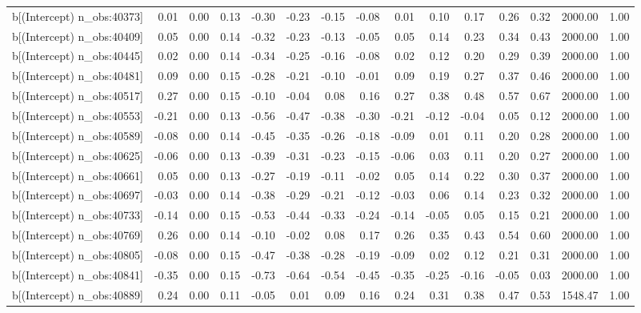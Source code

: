 \begin{table}[ht]
\begin{tabular}{rrrrrrrrrrrrrrr}
  b[(Intercept) n\_obs:40373] & 0.01 & 0.00 & 0.13 & -0.30 & -0.23 & -0.15 & -0.08 & 0.01 & 0.10 & 0.17 & 0.26 & 0.32 & 2000.00 & 1.00 \\ 
  b[(Intercept) n\_obs:40409] & 0.05 & 0.00 & 0.14 & -0.32 & -0.23 & -0.13 & -0.05 & 0.05 & 0.14 & 0.23 & 0.34 & 0.43 & 2000.00 & 1.00 \\ 
  b[(Intercept) n\_obs:40445] & 0.02 & 0.00 & 0.14 & -0.34 & -0.25 & -0.16 & -0.08 & 0.02 & 0.12 & 0.20 & 0.29 & 0.39 & 2000.00 & 1.00 \\ 
  b[(Intercept) n\_obs:40481] & 0.09 & 0.00 & 0.15 & -0.28 & -0.21 & -0.10 & -0.01 & 0.09 & 0.19 & 0.27 & 0.37 & 0.46 & 2000.00 & 1.00 \\ 
  b[(Intercept) n\_obs:40517] & 0.27 & 0.00 & 0.15 & -0.10 & -0.04 & 0.08 & 0.16 & 0.27 & 0.38 & 0.48 & 0.57 & 0.67 & 2000.00 & 1.00 \\ 
  b[(Intercept) n\_obs:40553] & -0.21 & 0.00 & 0.13 & -0.56 & -0.47 & -0.38 & -0.30 & -0.21 & -0.12 & -0.04 & 0.05 & 0.12 & 2000.00 & 1.00 \\ 
  b[(Intercept) n\_obs:40589] & -0.08 & 0.00 & 0.14 & -0.45 & -0.35 & -0.26 & -0.18 & -0.09 & 0.01 & 0.11 & 0.20 & 0.28 & 2000.00 & 1.00 \\ 
  b[(Intercept) n\_obs:40625] & -0.06 & 0.00 & 0.13 & -0.39 & -0.31 & -0.23 & -0.15 & -0.06 & 0.03 & 0.11 & 0.20 & 0.27 & 2000.00 & 1.00 \\ 
  b[(Intercept) n\_obs:40661] & 0.05 & 0.00 & 0.13 & -0.27 & -0.19 & -0.11 & -0.02 & 0.05 & 0.14 & 0.22 & 0.30 & 0.37 & 2000.00 & 1.00 \\ 
  b[(Intercept) n\_obs:40697] & -0.03 & 0.00 & 0.14 & -0.38 & -0.29 & -0.21 & -0.12 & -0.03 & 0.06 & 0.14 & 0.23 & 0.32 & 2000.00 & 1.00 \\ 
  b[(Intercept) n\_obs:40733] & -0.14 & 0.00 & 0.15 & -0.53 & -0.44 & -0.33 & -0.24 & -0.14 & -0.05 & 0.05 & 0.15 & 0.21 & 2000.00 & 1.00 \\ 
  b[(Intercept) n\_obs:40769] & 0.26 & 0.00 & 0.14 & -0.10 & -0.02 & 0.08 & 0.17 & 0.26 & 0.35 & 0.43 & 0.54 & 0.60 & 2000.00 & 1.00 \\ 
  b[(Intercept) n\_obs:40805] & -0.08 & 0.00 & 0.15 & -0.47 & -0.38 & -0.28 & -0.19 & -0.09 & 0.02 & 0.12 & 0.21 & 0.31 & 2000.00 & 1.00 \\ 
  b[(Intercept) n\_obs:40841] & -0.35 & 0.00 & 0.15 & -0.73 & -0.64 & -0.54 & -0.45 & -0.35 & -0.25 & -0.16 & -0.05 & 0.03 & 2000.00 & 1.00 \\ 
  b[(Intercept) n\_obs:40889] & 0.24 & 0.00 & 0.11 & -0.05 & 0.01 & 0.09 & 0.16 & 0.24 & 0.31 & 0.38 & 0.47 & 0.53 & 1548.47 & 1.00 \\ 

\end{tabular}
\end{table}
